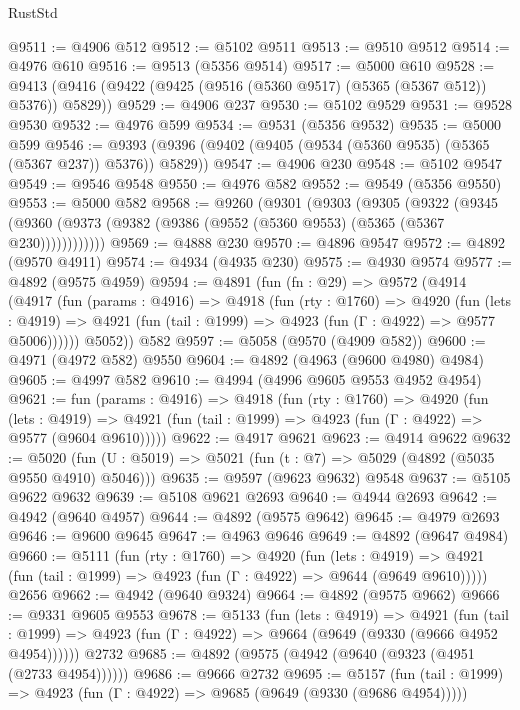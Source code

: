 \begin{lexlean}{RustStd}
\begin{coremodule}
@9511 := @4906 @512
@9512 := @5102 @9511
@9513 := @9510 @9512
@9514 := @4976 @610
@9516 := @9513 (@5356 @9514)
@9517 := @5000 @610
@9528 := @9413 (@9416 (@9422 (@9425 (@9516 (@5360 @9517) (@5365 (@5367 @512)) @5376)) @5829))
@9529 := @4906 @237
@9530 := @5102 @9529
@9531 := @9528 @9530
@9532 := @4976 @599
@9534 := @9531 (@5356 @9532)
@9535 := @5000 @599
@9546 := @9393 (@9396 (@9402 (@9405 (@9534 (@5360 @9535) (@5365 (@5367 @237)) @5376)) @5829))
@9547 := @4906 @230
@9548 := @5102 @9547
@9549 := @9546 @9548
@9550 := @4976 @582
@9552 := @9549 (@5356 @9550)
@9553 := @5000 @582
@9568 := @9260
    (@9301
      (@9303
        (@9305
          (@9322
            (@9345 (@9360 (@9373 (@9382 (@9386 (@9552 (@5360 @9553) (@5365 (@5367 @230))))))))))))
@9569 := @4888 @230
@9570 := @4896 @9547
@9572 := @4892 (@9570 @4911)
@9574 := @4934 (@4935 @230)
@9575 := @4930 @9574
@9577 := @4892 (@9575 @4959)
@9594 := @4891
    (fun (fn : @29) =>
    @9572
      (@4914
        (@4917
          (fun (params : @4916) =>
          @4918
            (fun (rty : @1760) =>
            @4920
              (fun (lets : @4919) =>
              @4921 (fun (tail : @1999) => @4923 (fun (Γ : @4922) => @9577 @5006))))))
        @5052))
    @582
@9597 := @5058 (@9570 (@4909 @582))
@9600 := @4971 (@4972 @582) @9550
@9604 := @4892 (@4963 (@9600 @4980) @4984)
@9605 := @4997 @582
@9610 := @4994 (@4996 @9605 @9553 @4952 @4954)
@9621 := fun (params : @4916) =>
  @4918
    (fun (rty : @1760) =>
    @4920
      (fun (lets : @4919) =>
      @4921 (fun (tail : @1999) => @4923 (fun (Γ : @4922) => @9577 (@9604 @9610)))))
@9622 := @4917 @9621
@9623 := @4914 @9622
@9632 := @5020 (fun (U : @5019) => @5021 (fun (t : @7) => @5029 (@4892 (@5035 @9550 @4910) @5046)))
@9635 := @9597 (@9623 @9632) @9548
@9637 := @5105 @9622 @9632
@9639 := @5108 @9621 @2693
@9640 := @4944 @2693
@9642 := @4942 (@9640 @4957)
@9644 := @4892 (@9575 @9642)
@9645 := @4979 @2693
@9646 := @9600 @9645
@9647 := @4963 @9646
@9649 := @4892 (@9647 @4984)
@9660 := @5111
    (fun (rty : @1760) =>
    @4920
      (fun (lets : @4919) =>
      @4921 (fun (tail : @1999) => @4923 (fun (Γ : @4922) => @9644 (@9649 @9610)))))
    @2656
@9662 := @4942 (@9640 @9324)
@9664 := @4892 (@9575 @9662)
@9666 := @9331 @9605 @9553
@9678 := @5133
    (fun (lets : @4919) =>
    @4921
      (fun (tail : @1999) => @4923 (fun (Γ : @4922) => @9664 (@9649 (@9330 (@9666 @4952 @4954))))))
    @2732
@9685 := @4892 (@9575 (@4942 (@9640 (@9323 (@4951 (@2733 @4954))))))
@9686 := @9666 @2732
@9695 := @5157
    (fun (tail : @1999) => @4923 (fun (Γ : @4922) => @9685 (@9649 (@9330 (@9686 @4954)))))

\end{coremodule}
\end{lexlean}
